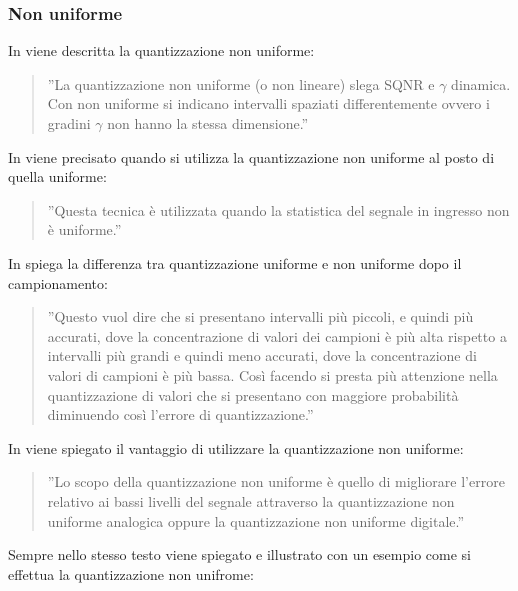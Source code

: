 \documentclass[a4paper]{report} %
\begin{document}
\subsubsection{Non uniforme}
In \cite{art:rif.18} viene descritta la quantizzazione non uniforme:
\begin{quote}
	''La quantizzazione non uniforme (o non lineare) slega SQNR e $\gamma$ dinamica. Con non uniforme si indicano intervalli spaziati differentemente ovvero i gradini $\gamma$ non hanno la stessa dimensione.''
\end{quote}
In \cite{art:rif.7} viene precisato quando si utilizza la quantizzazione non uniforme al posto di quella uniforme:
\begin{quote}
	''Questa tecnica è utilizzata quando la statistica del segnale in ingresso non è uniforme.''
\end{quote}
In \cite{art:rif.6} spiega la differenza tra quantizzazione uniforme e non uniforme dopo il campionamento:
\begin{quote}
	''Questo vuol dire che si presentano intervalli più piccoli, e quindi più accurati, dove la concentrazione di valori dei campioni è più alta rispetto a intervalli più grandi e quindi meno accurati, dove la concentrazione di valori di campioni è più bassa. Così facendo si presta più attenzione nella quantizzazione di valori che si presentano con maggiore probabilità diminuendo così l'errore di quantizzazione.'' 
\end{quote}
In \cite{art:rif.8} viene spiegato il vantaggio di utilizzare la quantizzazione non uniforme:
\begin{quote}
	''Lo scopo della quantizzazione non uniforme è quello di migliorare l'errore relativo ai bassi livelli del segnale attraverso la quantizzazione non uniforme analogica oppure la quantizzazione non uniforme digitale.''
\end{quote}
Sempre nello stesso testo viene spiegato e illustrato con un esempio come si effettua la quantizzazione non unifrome:
\end{document}

